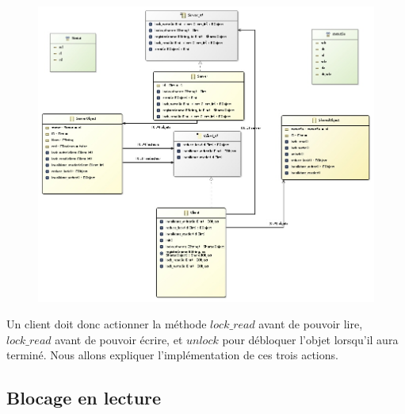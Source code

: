 \documentclass[11pt,a4paper]{report}
\begin{document}
\begin{figure}[!h]
\begin{center}
\includegraphics[scale=0.5]{diagram.jpg}
\end{center}
\end{figure}

Un client doit donc actionner la méthode $lock\_read$ avant de pouvoir lire, $lock\_read$ avant de pouvoir écrire, et $unlock$ pour débloquer l'objet lorsqu'il aura terminé. Nous allons expliquer l'implémentation de ces trois actions.

\subsection{Blocage en lecture}
\end{document}
